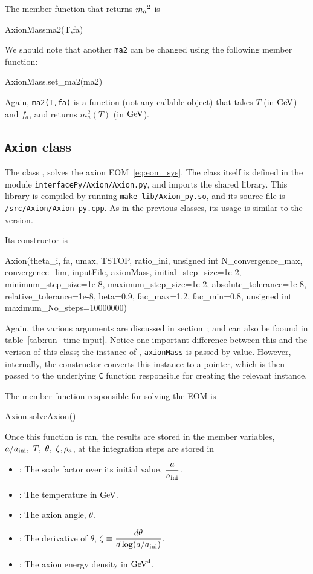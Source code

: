 \documentclass[11pt,a4paper]{article}
\begin{document}
The member function that returns $\tilde m_{a}{}^2$ is
%
\begin{py}
	AxionMassma2(T,fa)
\end{py}
%
We should note that another {\tt ma2} can be changed using the following member function:
%
\begin{cpp}
	AxionMass.set_ma2(ma2)
\end{cpp}
%
Again, {\tt ma2(T,fa)} is a function (not any callable object) that takes $T$ (in ${\rm GeV}$) and $f_a$, and returns  $m_a^2(T)$ (in ${\rm GeV}$).




\subsection{{\tt Axion} class}
%
The class , solves the axion EOM~\ref{eq:eom_sys}. The class itself is defined in the module {\tt interfacePy/Axion/Axion.py}, and imports the shared library. This library is compiled by running {\tt make lib/Axion\_py.so}, and its source file is {\tt \mimes/src/Axion/Axion-py.cpp}. As in the previous classes, its usage is similar to the \CPP version.

Its constructor is 
%
\begin{cpp}
	Axion(theta_i, fa, umax, TSTOP, 
	ratio_ini, unsigned int N_convergence_max, convergence_lim, 
	inputFile, axionMass, initial_step_size=1e-2, 
	minimum_step_size=1e-8, maximum_step_size=1e-2, absolute_tolerance=1e-8, 
	relative_tolerance=1e-8, beta=0.9, fac_max=1.2, fac_min=0.8, 
	unsigned int maximum_No_steps=10000000)
\end{cpp}
%
Again, the various arguments are discussed in section~; and can also be foound in table~\ref{tab:run_time-input}. Notice one important difference between this and the \CPP verison of this class; the instance of , {\tt axionMass} is passed by value. However, internally, the constructor converts this instance to a pointer, which is then passed to the underlying {\tt C} function responsible for creating the relevant instance.
%

The member function responsible for solving the EOM is
%
\begin{cpp}
	Axion.solveAxion()
\end{cpp}
%
Once this function is ran, the results are stored in the member variables, $a/a_{\rm ini}{}, \ T, \ \theta, \ \zeta, \rho_a$, at the integration steps are stored in
%
\begin{itemize}
	\item {}: The scale factor over its initial value, $\dfrac{a}{a_{\rm ini}{}}$.
	\item {}: The temperature in ${\rm GeV}$.
	\item {}: The axion angle, $\theta$.
	\item {}: The derivative of $\theta$, $\zeta \equiv \dfrac{d \theta}{d \log (a/a_{\rm ini}{})}$.
	\item {}: The axion energy density in ${\rm GeV}^4$.
\end{itemize}
\end{document}
